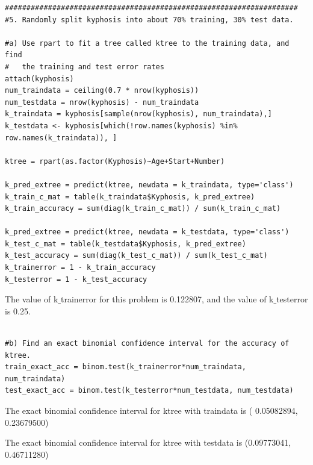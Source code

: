 \documentclass[11pt]{article}
\begin{document}
\begin{Verbatim}
####################################################################
#5. Randomly split kyphosis into about 70% training, 30% test data.

#a) Use rpart to fit a tree called ktree to the training data, and find 
#   the training and test error rates
attach(kyphosis)
num_traindata = ceiling(0.7 * nrow(kyphosis))
num_testdata = nrow(kyphosis) - num_traindata
k_traindata = kyphosis[sample(nrow(kyphosis), num_traindata),]
k_testdata <- kyphosis[which(!row.names(kyphosis) %in% row.names(k_traindata)), ]

ktree = rpart(as.factor(Kyphosis)~Age+Start+Number)

k_pred_extree = predict(ktree, newdata = k_traindata, type='class')
k_train_c_mat = table(k_traindata$Kyphosis, k_pred_extree)
k_train_accuracy = sum(diag(k_train_c_mat)) / sum(k_train_c_mat)

k_pred_extree = predict(ktree, newdata = k_testdata, type='class')
k_test_c_mat = table(k_testdata$Kyphosis, k_pred_extree)
k_test_accuracy = sum(diag(k_test_c_mat)) / sum(k_test_c_mat)
k_trainerror = 1 - k_train_accuracy
k_testerror = 1 - k_test_accuracy
\end{Verbatim}
The value of k$\_$trainerror for this problem is 0.122807, and the value of 
k$\_$testerror is 0.25.
\begin{Verbatim}

#b) Find an exact binomial confidence interval for the accuracy of ktree.
train_exact_acc = binom.test(k_trainerror*num_traindata, num_traindata)
test_exact_acc = binom.test(k_testerror*num_testdata, num_testdata)
\end{Verbatim}

The exact binomial confidence interval for ktree with traindata is
( 0.05082894, 0.23679500)

The exact binomial confidence interval for ktree with testdata is 
(0.09773041, 0.46711280)
\end{document}
